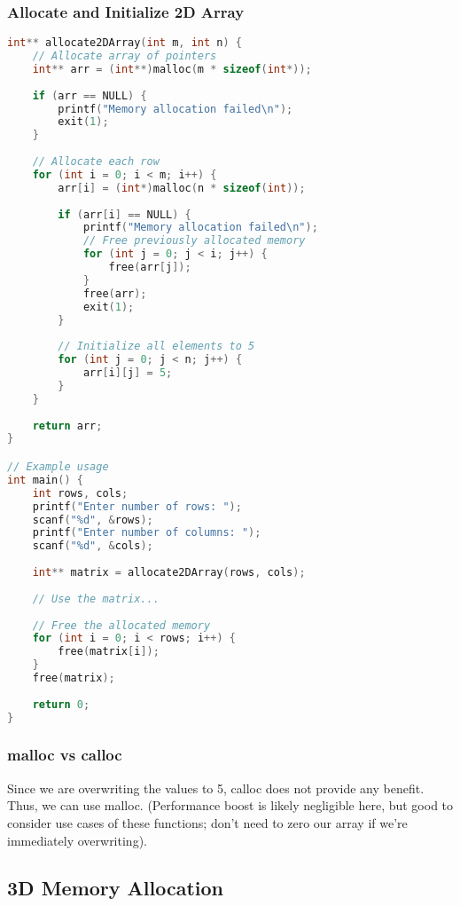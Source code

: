 \documentclass[12pt]{article}
\begin{document}
\subsubsection{Allocate and Initialize 2D Array}
\begin{lstlisting}[language=C]
int** allocate2DArray(int m, int n) {
    // Allocate array of pointers
    int** arr = (int**)malloc(m * sizeof(int*));
    
    if (arr == NULL) {
        printf("Memory allocation failed\n");
        exit(1);
    }
    
    // Allocate each row
    for (int i = 0; i < m; i++) {
        arr[i] = (int*)malloc(n * sizeof(int));
        
        if (arr[i] == NULL) {
            printf("Memory allocation failed\n");
            // Free previously allocated memory
            for (int j = 0; j < i; j++) {
                free(arr[j]);
            }
            free(arr);
            exit(1);
        }
        
        // Initialize all elements to 5
        for (int j = 0; j < n; j++) {
            arr[i][j] = 5;
        }
    }
    
    return arr;
}

// Example usage
int main() {
    int rows, cols;
    printf("Enter number of rows: ");
    scanf("%d", &rows);
    printf("Enter number of columns: ");
    scanf("%d", &cols);
    
    int** matrix = allocate2DArray(rows, cols);
    
    // Use the matrix...
    
    // Free the allocated memory
    for (int i = 0; i < rows; i++) {
        free(matrix[i]);
    }
    free(matrix);
    
    return 0;
}
\end{lstlisting}

\subsubsection{malloc vs calloc}
Since we are overwriting the values to 5, calloc does not provide any benefit. Thus, we can use malloc. (Performance boost is likely negligible here, but good to consider use cases of these functions; don't need to zero our array if we're immediately overwriting).

\subsection{3D Memory Allocation}
\end{document}

